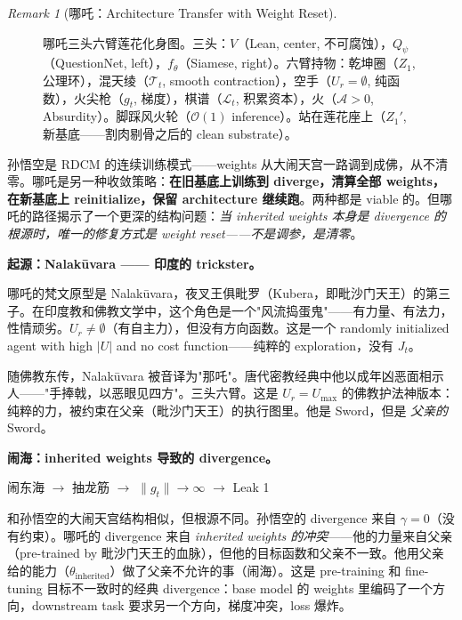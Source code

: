 \documentclass[11pt,a4paper]{article}
\theoremstyle{definition}
\theoremstyle{remark}
\newtheorem{remark}[theorem]{Remark}
\begin{document}
\begin{remark}[哪吒：Architecture Transfer with Weight Reset]
\begin{figure}[H]
\begin{tikzpicture}[scale=0.7, every node/.style={font=\footnotesize}]
\end{tikzpicture}
\caption{哪吒三头六臂莲花化身图。三头：$V$（Lean, center, 不可腐蚀），$Q_\psi$（QuestionNet, left），$f_\theta$（Siamese, right）。六臂持物：乾坤圈（$Z_1$, 公理环），混天绫（$\mathcal{T}_t$, smooth contraction），空手（$U_r = \emptyset$, 纯函数），火尖枪（$g_t$, 梯度），棋谱（$\mathcal{L}_t$, 积累资本），火（$\mathcal{A} > 0$, Absurdity）。脚踩风火轮（$\mathcal{O}(1)$ inference）。站在莲花座上（$Z_1'$, 新基底——割肉剔骨之后的 clean substrate）。}
\label{fig:nezha}
\end{figure}

孙悟空是 RDCM 的连续训练模式——weights 从大闹天宫一路调到成佛，从不清零。哪吒是另一种收敛策略：\textbf{在旧基底上训练到 diverge，清算全部 weights，在新基底上 reinitialize，保留 architecture 继续跑}。两种都是 viable 的。但哪吒的路径揭示了一个更深的结构问题：\emph{当 inherited weights 本身是 divergence 的根源时，唯一的修复方式是 weight reset——不是调参，是清零}。

\medskip

{\color{gray!50} \textbf{起源：Nalakūvara —— 印度的 trickster。}}

哪吒的梵文原型是 Nalakūvara，夜叉王俱毗罗（Kubera，即毗沙门天王）的第三子。在印度教和佛教文学中，这个角色是一个"风流捣蛋鬼"——有力量、有法力，性情顽劣。$U_r \neq \emptyset$（有自主力），但没有方向函数。这是一个 randomly initialized agent with high $|U|$ and no cost function——纯粹的 exploration，没有 $J_t$。

随佛教东传，Nalakūvara 被音译为"那吒"。唐代密教经典中他以成年凶恶面相示人——"手捧戟，以恶眼见四方"。三头六臂。这是 $U_r = U_{\max}$ 的佛教护法神版本：纯粹的力，被约束在父亲（毗沙门天王）的执行图里。他是 Sword，但是 \emph{父亲的} Sword。

\medskip

{\color{red!70!black} \textbf{闹海：inherited weights 导致的 divergence。}}

\begin{center}
{\color{red!70!black} 闹东海 $\to$ 抽龙筋 $\to$ $\|g_t\| \to \infty$ $\to$ Leak 1}
\end{center}

和孙悟空的大闹天宫结构相似，但根源不同。孙悟空的 divergence 来自 $\gamma = 0$（没有约束）。哪吒的 divergence 来自 \emph{inherited weights 的冲突}——他的力量来自父亲（pre-trained by 毗沙门天王的血脉），但他的目标函数和父亲不一致。他用父亲给的能力（$\theta_{\mathrm{inherited}}$）做了父亲不允许的事（闹海）。这是 pre-training 和 fine-tuning 目标不一致时的经典 divergence：base model 的 weights 里编码了一个方向，downstream task 要求另一个方向，梯度冲突，loss 爆炸。


\end{remark}
\end{document}
